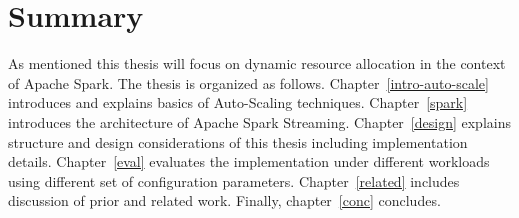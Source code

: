 \section{Summary}
As mentioned this thesis will focus on dynamic resource allocation in the context of Apache Spark. The thesis is organized as follows. Chapter~\ref{intro-auto-scale} introduces and explains basics of Auto-Scaling techniques. Chapter~\ref{spark} introduces the architecture of Apache Spark Streaming. Chapter~\ref{design} explains structure and design considerations of this thesis including implementation details. Chapter~\ref{eval} evaluates the implementation under different workloads using different set of configuration parameters. Chapter~\ref{related} includes discussion of prior and related work. Finally, chapter~\ref{conc} concludes.